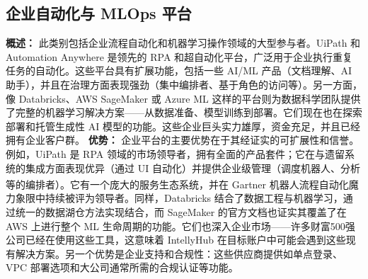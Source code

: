 \documentclass[11pt, a4paper, oneside]{article}
\begin{document}
\subsection{企业自动化与 MLOps 平台}
\textbf{概述：} 此类别包括企业流程自动化和机器学习操作领域的大型参与者。UiPath 和 Automation Anywhere 是领先的 RPA 和超自动化平台，广泛用于企业执行重复任务的自动化。这些平台具有扩展功能，包括一些 AI/ML 产品（文档理解、AI 助手），并且在治理方面表现强劲（集中编排者、基于角色的访问等）。另一方面，像 Databricks、AWS SageMaker 或 Azure ML 这样的平台则为数据科学团队提供了完整的机器学习解决方案——从数据准备、模型训练到部署。它们现在也在探索部署和托管生成性 AI 模型的功能。这些企业巨头实力雄厚，资金充足，并且已经拥有企业客户群。\newline \newline
\textbf{优势：} 企业平台的主要优势在于其经证实的可扩展性和信誉。例如，UiPath 是 RPA 领域的市场领导者，拥有全面的产品套件；它在与遗留系统的集成方面表现优异（通过 UI 自动化）并提供企业级管理（调度机器人、分析等的编排者）。它有一个庞大的服务生态系统，并在 Gartner\textsuperscript{\textregistered} 机器人流程自动化魔力象限中持续被评为领导者\cite{uipathGartner}。同样，Databricks 结合了数据工程与机器学习，通过统一的数据湖仓方法实现结合，而 SageMaker 的官方文档也证实其覆盖了在 AWS 上进行整个 ML 生命周期的功能\cite{awsSagemaker}。它们也深入企业市场——许多财富500强公司已经在使用这些工具，这意味着 IntellyHub 在目标账户中可能会遇到这些现有解决方案。另一个优势是企业支持和合规性：这些供应商提供如单点登录、VPC 部署选项和大公司通常所需的合规认证等功能。\newline \newline
\end{document}
